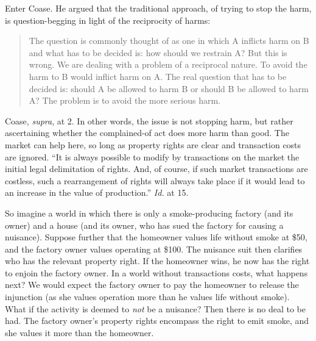 Enter Coase. He argued that the traditional approach, of trying to stop the
harm, is question-begging in light of the reciprocity of harms: 
\begin{quote}
The question is commonly thought of as one in which A inflicts harm on B and
what has to be decided is: how should we restrain A? But this is wrong. We are
dealing with a problem of a reciprocal nature. To avoid the harm to B would
inflict harm on A. The real question that has to be decided is: should A be
allowed to harm B or should B be allowed to harm A? The problem is to avoid the
more serious harm.
\end{quote}
Coase, \textit{supra}, at 2. In other words, the issue is not stopping harm, but
rather ascertaining whether the complained-of act does more harm than good. The
market can help here, so long as property rights are clear and transaction costs
are ignored. ``It is always possible to modify by transactions on the market the
initial legal delimitation of rights. And, of course, if such market
transactions are costless, such a rearrangement of rights will always take place
if it would lead to an increase in the value of production.'' \textit{Id.} at
15.

So imagine a world in which there is only a smoke-producing factory (and its
owner) and a house (and its owner, who has sued the factory for causing a
nuisance). Suppose further that the homeowner values life without smoke at \$50,
and the factory owner values operating at \$100. The nuisance suit then
clarifies who has the relevant property right. If the homeowner wins, he now has
the right to enjoin the factory owner. In a world without transactions costs,
what happens next? We would expect the factory owner to pay the homeowner to
release the injunction (as she values operation more than he values life without
smoke). What if the activity is deemed to \textit{not} be a nuisance? Then there
is no deal to be had. The factory owner's property rights encompass the right to
emit smoke, and she values it more than the homeowner.

